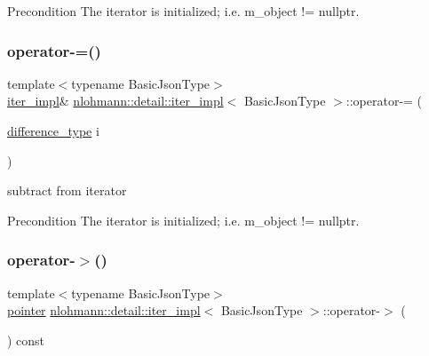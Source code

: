 \begin{DoxyPrecond}{Precondition}
The iterator is initialized; i.\+e. {\ttfamily m\+\_\+object != nullptr}. 
\end{DoxyPrecond}
\mbox{\label{classnlohmann_1_1detail_1_1iter__impl_abcc9d51bc52f2e8483bbe4018f05e978}} 
\subsubsection{\texorpdfstring{operator-\/=()}{operator-=()}}
{\footnotesize\ttfamily template$<$typename Basic\+Json\+Type$>$ \\
\mbox{\hyperlink{classnlohmann_1_1detail_1_1iter__impl}{iter\+\_\+impl}}\& \mbox{\hyperlink{classnlohmann_1_1detail_1_1iter__impl}{nlohmann\+::detail\+::iter\+\_\+impl}}$<$ Basic\+Json\+Type $>$\+::operator-\/= (\begin{DoxyParamCaption}\item[{\mbox{\hyperlink{classnlohmann_1_1detail_1_1iter__impl_a2f7ea9f7022850809c60fc3263775840}{difference\+\_\+type}}}]{i }\end{DoxyParamCaption})\hspace{0.3cm}{\ttfamily [inline]}}



subtract from iterator 

\begin{DoxyPrecond}{Precondition}
The iterator is initialized; i.\+e. {\ttfamily m\+\_\+object != nullptr}. 
\end{DoxyPrecond}
\mbox{\label{classnlohmann_1_1detail_1_1iter__impl_a6da3d2b34528aff328f3dcb513076dec}} 
\subsubsection{\texorpdfstring{operator-\/$>$()}{operator->()}}
{\footnotesize\ttfamily template$<$typename Basic\+Json\+Type$>$ \\
\mbox{\hyperlink{classnlohmann_1_1detail_1_1iter__impl_a69e52f890ce8c556fd68ce109e24b360}{pointer}} \mbox{\hyperlink{classnlohmann_1_1detail_1_1iter__impl}{nlohmann\+::detail\+::iter\+\_\+impl}}$<$ Basic\+Json\+Type $>$\+::operator-\/$>$ (\begin{DoxyParamCaption}{ }\end{DoxyParamCaption}) const\hspace{0.3cm}{\ttfamily [inline]}}



